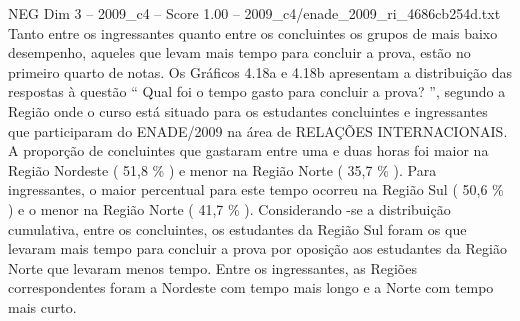 \begin{textsample}{NEG Dim 3 – 2009\_c4 – Score 1.00 – 2009\_c4/enade\_2009\_ri\_4686cb254d.txt}
Tanto entre os ingressantes quanto entre os concluintes os grupos de mais baixo desempenho, aqueles que levam mais tempo para concluir a prova, estão no primeiro quarto de notas.
Os Gráficos 4.18a e 4.18b apresentam a distribuição das respostas à questão “ Qual foi o tempo gasto para concluir a prova? ”, segundo a Região onde o curso está situado para os estudantes concluintes e ingressantes que participaram do ENADE/2009 na área de RELAÇÕES INTERNACIONAIS.
A proporção de concluintes que gastaram entre uma e duas horas foi maior na Região Nordeste ( 51,8 \% ) e menor na Região Norte ( 35,7 \% ).
Para ingressantes, o maior percentual para este tempo ocorreu na Região Sul ( 50,6 \% ) e o menor na Região Norte ( 41,7 \% ).
Considerando -se a distribuição cumulativa, entre os concluintes, os estudantes da Região Sul foram os que levaram mais tempo para concluir a prova por oposição aos estudantes da Região Norte que levaram menos tempo.
Entre os ingressantes, as Regiões correspondentes foram a Nordeste com tempo mais longo e a Norte com tempo mais curto.

\end{textsample}
